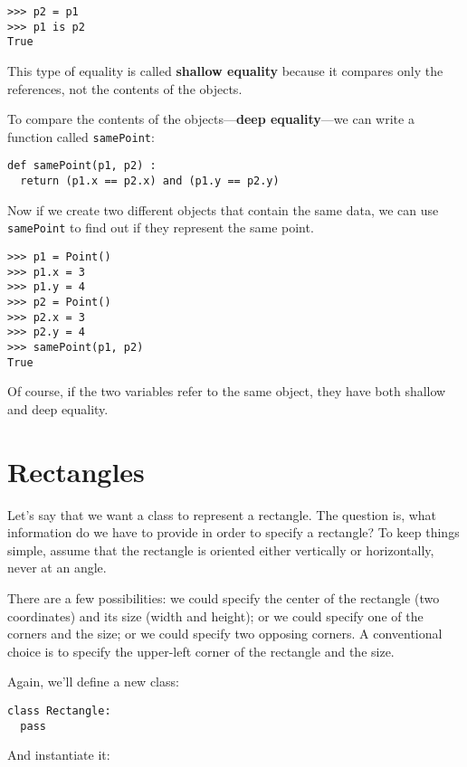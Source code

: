 \beforeverb
\begin{verbatim}
>>> p2 = p1
>>> p1 is p2
True
\end{verbatim}
\afterverb
%
This type of equality is called {\bf shallow equality} because
it compares only the references, not the contents of the objects.


To compare the contents of the objects---{\bf deep equality}---we
can write a function called {\tt samePoint}:

\beforeverb
\begin{verbatim}
def samePoint(p1, p2) :
  return (p1.x == p2.x) and (p1.y == p2.y)
\end{verbatim}
\afterverb
%
Now if we create two different objects that contain the same
data, we can use {\tt samePoint} to find out if they represent the
same point.

\pagebreak

\beforeverb
\begin{verbatim}
>>> p1 = Point()
>>> p1.x = 3
>>> p1.y = 4
>>> p2 = Point()
>>> p2.x = 3
>>> p2.y = 4
>>> samePoint(p1, p2)
True
\end{verbatim}
\afterverb
%
Of course, if the two variables refer to the same object,
they have both shallow and deep equality.


\section{Rectangles}

Let's say that we want a class to represent a rectangle.  The question
is, what information do we have to provide in order to specify a
rectangle? To keep things simple, assume that the rectangle is
oriented either vertically or horizontally, never at an angle.

There are a few possibilities: we could specify the center of the
rectangle (two coordinates) and its size (width and height); or we
could specify one of the corners and the size; or we could specify two
opposing corners.  A conventional choice is to specify the upper-left
corner of the rectangle and the size.

Again, we'll define a new class:

\beforeverb
\begin{verbatim}
class Rectangle:
  pass
\end{verbatim}
\afterverb
%
And instantiate it:

